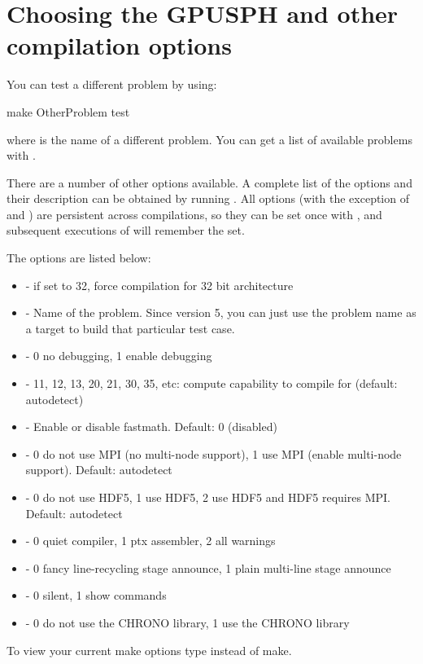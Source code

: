 \documentclass{../GPUSPHtemplate}
\begin{document}


\section{Choosing the GPUSPH  and other compilation options}\label{sec:compileoptions}

You can test a different problem by using:
\begin{shellcode}
make OtherProblem test
\end{shellcode}
where  is the name of a different problem. You can get
a list of available problems with .

There are a number of other options available. A complete list of the
options and their description can be obtained by running . All options (with the exception of  and
) are persistent across compilations, so they can be set once
with , and subsequent executions of 
will remember the  set.

The  options are listed below:
\begin{itemize}
\item {} - if set to 32, force compilation for 32 bit architecture
\item {} - Name of the problem. Since version 5, you can just use the problem name as a target to build that particular test case.
\item {} - 0 no debugging, 1 enable debugging
\item {} - 11, 12, 13, 20, 21, 30, 35, etc: compute capability to compile for (default: autodetect)
\item {} - Enable or disable fastmath. Default: 0 (disabled)
\item {} - 0 do not use MPI (no multi-node support), 1 use MPI (enable multi-node support). Default: autodetect
\item {} - 0 do not use HDF5, 1 use HDF5, 2 use HDF5 and HDF5 requires MPI. Default: autodetect
\item {} - 0 quiet compiler, 1 ptx assembler, 2 all warnings
\item {} - 0 fancy line-recycling stage announce, 1 plain multi-line stage announce
\item {} - 0 silent, 1 show commands
\item {} - 0 do not use the CHRONO library, 1 use the CHRONO library
\end{itemize}
To view your current make options type  instead of make.
\end{document}
